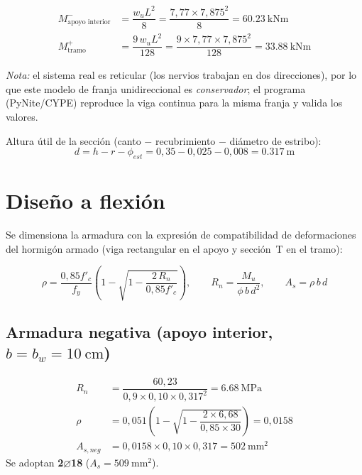 \begin{align}
  M^{-}_{\text{apoyo interior}} &= \dfrac{w_u L^2}{8} =
  \dfrac{7{,}77 \times 7{,}875^2}{8} = \SI{60,23}{\kilo\newton\meter}\\
  M^{+}_{\text{tramo}} &= \dfrac{9\,w_u L^2}{128} =
  \dfrac{9 \times 7{,}77 \times 7{,}875^2}{128} = \SI{33,88}{\kilo\newton\meter}
\end{align}

\emph{Nota:} el sistema real es reticular (los nervios trabajan en dos
direcciones), por lo que este modelo de franja unidireccional es
\emph{conservador}; el programa (PyNite/CYPE) reproduce la viga continua
para la misma franja y valida los valores.

Altura útil de la sección (canto $-$ recubrimiento $-$ diámetro de
estribo):
\begin{equation}
  d = h - r - \phi_{est} = 0{,}35 - 0{,}025 - 0{,}008 = \SI{0,317}{\meter}
\end{equation}

\section{Diseño a flexión}
\label{sec:flexion}

Se dimensiona la armadura con la expresión de compatibilidad de
deformaciones del hormigón armado (viga rectangular en el apoyo y
sección~T en el tramo):

\begin{equation}
  \rho = \dfrac{0{,}85 f'_c}{f_y}
  \left(1 - \sqrt{1 - \dfrac{2\,R_n}{0{,}85 f'_c}}\right),
  \qquad
  R_n = \dfrac{M_u}{\phi\,b\,d^2}, \qquad
  A_s = \rho\, b\, d
  \label{eq:flex}
\end{equation}

\subsection{Armadura negativa (apoyo interior, $b = b_w = \SI{10}{\centi\meter}$)}
\begin{align}
  R_n &= \dfrac{60{,}23}{0{,}9 \times 0{,}10 \times 0{,}317^2}
       = \SI{6,68}{\mega\pascal}\\
  \rho &= 0{,}051\left(1 - \sqrt{1 - \dfrac{2 \times 6{,}68}{0{,}85 \times 30}}\right)
       = 0{,}0158\\
  A_{s,neg} &= 0{,}0158 \times 0{,}10 \times 0{,}317 = \SI{502}{\milli\meter^2}
\end{align}
Se adoptan \textbf{2$\varnothing$18} ($A_s = \SI{509}{\milli\meter^2}$).

